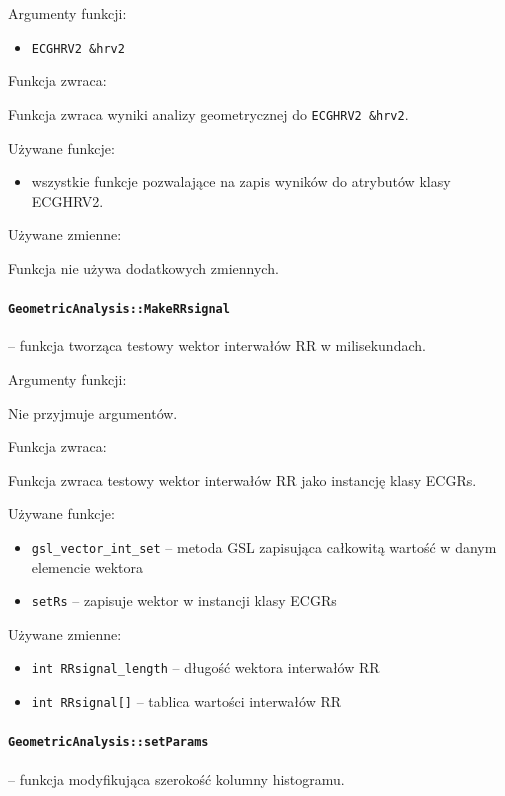\documentclass[a4paper, 11pt]{article}
\begin{document}
\medskip{}


Argumenty funkcji:
\begin{itemize}
\item \verb+ECGHRV2 &hrv2+
\end{itemize}
\medskip{}


Funkcja zwraca:

Funkcja zwraca wyniki analizy geometrycznej do \verb+ECGHRV2 &hrv2+.

\medskip{}


Używane funkcje:
\begin{itemize}
\item wszystkie funkcje pozwalające na zapis wyników do atrybutów klasy
ECGHRV2. \medskip{}

\end{itemize}
Używane zmienne:

Funkcja nie używa dodatkowych zmiennych.%


\paragraph{\texttt{GeometricAnalysis::MakeRRsignal}} -- funkcja tworząca testowy wektor interwałów RR w milisekundach.

\medskip{}


Argumenty funkcji:

Nie przyjmuje argumentów.

\medskip{}


Funkcja zwraca:

Funkcja zwraca testowy wektor interwałów RR jako instancję klasy ECGRs.

\medskip{}


Używane funkcje:
\begin{itemize}
\item \verb+gsl_vector_int_set+ -- metoda GSL zapisująca całkowitą wartość w
danym elemencie wektora
\item \verb+setRs+ -- zapisuje wektor w instancji klasy ECGRs
\end{itemize}
\medskip{}


Używane zmienne:
\begin{itemize}
\item \verb+int RRsignal_length+ -- długość wektora interwałów RR
\item \verb+int RRsignal[]+ -- tablica wartości interwałów RR
\end{itemize}
%

\paragraph{\texttt{GeometricAnalysis::setParams}} -- funkcja modyfikująca szerokość kolumny histogramu.
\end{document}
